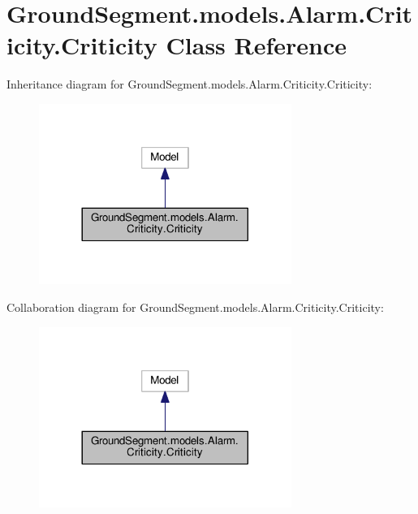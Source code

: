 \hypertarget{class_ground_segment_1_1models_1_1_alarm_1_1_criticity_1_1_criticity}{}\section{Ground\+Segment.\+models.\+Alarm.\+Criticity.\+Criticity Class Reference}
\label{class_ground_segment_1_1models_1_1_alarm_1_1_criticity_1_1_criticity}


Inheritance diagram for Ground\+Segment.\+models.\+Alarm.\+Criticity.\+Criticity\+:\nopagebreak
\begin{figure}[H]
\begin{center}
\leavevmode
\includegraphics[width=233pt]{class_ground_segment_1_1models_1_1_alarm_1_1_criticity_1_1_criticity__inherit__graph}
\end{center}
\end{figure}


Collaboration diagram for Ground\+Segment.\+models.\+Alarm.\+Criticity.\+Criticity\+:\nopagebreak
\begin{figure}[H]
\begin{center}
\leavevmode
\includegraphics[width=233pt]{class_ground_segment_1_1models_1_1_alarm_1_1_criticity_1_1_criticity__coll__graph}
\end{center}
\end{figure}

